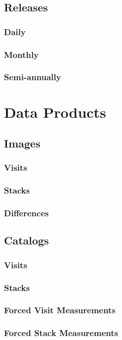 \documentclass[12pt]{article}
\begin{document}
\subsection{Releases}
\subsubsection{Daily}
\subsubsection{Monthly}
\subsubsection{Semi-annually}

\section{Data Products}
\label{sec:products}
\subsection{Images}
\subsubsection{Visits}
\subsubsection{Stacks}
\subsubsection{Differences}
\subsection{Catalogs}
\subsubsection{Visits}
\subsubsection{Stacks}
\subsubsection{Forced Visit Measurements}
\subsubsection{Forced Stack Measurements}
\end{document}

